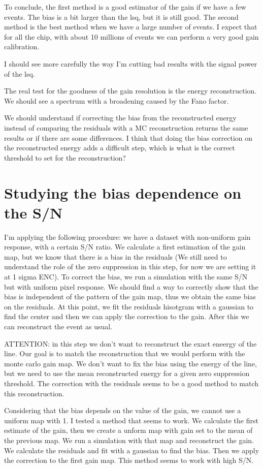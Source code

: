 To conclude, the first method is a good estimator of the gain if we have a few events. The bias is a bit larger than the lsq, but it is still good. The second method is the best method when we have a large number of events. I expect that for all the chip, with about 10 millions of events we can perform a very good gain calibration. 

I should see more carefully the way I'm cutting bad results with the signal power of the lsq.

The real test for the goodness of the gain resolution is the energy reconstruction. We should see a spectrum with a broadening caused by the Fano factor.

We should understand if correcting the bias from the reconstructed energy instead of comparing the residuals with a MC reconstruction returns the same results or if there are some differences. I think that doing the bias correction on the reconstructed energy adds a difficult step, which is what is the correct threshold to set for the reconstruction?

\section{Studying the bias dependence on the S/N}
I'm applying the following procedure: we have a dataset with non-uniform gain response, with a certain S/N ratio. We calculate a first estimation of the gain map, but we know that there is a bias in the residuals (We still need to understand the role of the zero suppression in this step, for now we are setting it at 1 sigma ENC). To correct the bias, we run a simulation with the same S/N but with uniform pixel response. We should find a way to correctly show that the bias is independent of the pattern of the gain map, thus we obtain the same bias on the residuals. At this point, we fit the residuals hisotgram with a gaussian to find the center and then we can apply the correction to the gain. After this we can reconstruct the event as usual.

ATTENTION: in this step we don't want to reconstruct the exact eneergy of the line. Our goal is to match the reconstruction that we would perform with the monte carlo gain map. We don't want to fix the bias using the energy of the line, but we need to use the mean reconstructed energy for a given zero suppression threshold. The correction with the residuals seems to be a good method to match this reconstruction.


Considering that the bias depends on the value of the gain, we cannot use a uniform map with 1. I tested a method that seems to work. We calculate the first estimate of the gain, then we create a unform map with gain set to the mean of the previous map. We run a simulation with that map and reconstruct the gain. We calculate the residuals and fit with a gaussian to find the bias. Then we apply the correction to the first gain map. This method seems to work with high S/N. 

